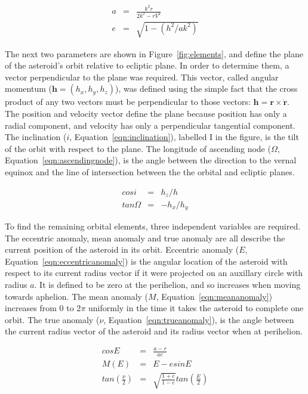 \documentclass[a4paper,12pt]{article}
\begin{document}
\begin{eqnarray}
\label{eqn:semimajor}
a &=& \frac{k^2r}{2k^2-rV^2}\\
\label{eqn:eccentricity}
e &=& \sqrt{1-(h^2/ak^2)}
\end{eqnarray}


The next two parameters are shown in Figure~\ref{fig:elements}, and define the plane of the asteroid's orbit relative to ecliptic plane. In order to determine them, a vector perpendicular to the plane was required. This vector, called angular momentum ($\mathbf{h} = (h_x,h_y,h_z)$), was defined using the simple fact that the cross product of any two vectors must be perpendicular to those vectors: $\mathbf{h} = \mathbf{r}\times\mathbf{\dot{r}}$. The position and velocity vector define the plane because position has only a radial component, and velocity has only a perpendicular tangential component. The inclination ($i$, Equation~\ref{eqn:inclination}), labelled I in the figure, is the tilt of the orbit with respect to the plane. The longitude of ascending node ($\Omega$, Equation~\ref{eqn:ascendingnode}), is the angle between the direction to the vernal equinox and the line of intersection between the the orbital and ecliptic planes.

\begin{eqnarray}
\label{eqn:inclination}
cosi &=& h_z/h\\
\label{eqn:ascendingnode}
tan\Omega &=& -h_x/h_y
\end{eqnarray}

To find the remaining orbital elements, three independent variables are required. The eccentric anomaly, mean anomaly and true anomaly are all describe the current position of the asteroid in its orbit. Eccentric anomaly ($E$, Equation~\ref{eqn:eccentricanomaly}) is the angular location of the asteroid with respect to its current radius vector if it were projected on an auxillary circle with radius $a$. It is defined to be zero at the perihelion, and so increases when moving towards aphelion. The mean anomaly ($M$, Equation~\ref{eqn:meananomaly}) increases from 0 to 2$\pi$ uniformly in the time it takes the asteroid to complete one orbit. The true anomaly ($\nu$, Equation~\ref{eqn:trueanomaly}), is the angle between the current radius vector of the asteroid and its radius vector when at perihelion.

\begin{eqnarray}
\label{eqn:eccentricanomaly}
cosE &=& \frac{a-r}{ae}\\
\label{eqn:meananomaly}
M(E) &=& E - esinE\\
\label{eqn:trueanomaly}
tan\left(\frac{\nu}{2}\right) &=& \sqrt{\frac{1+e}{1-e}}tan\left(\frac{E}{2}\right)
\end{eqnarray}
\end{document}
